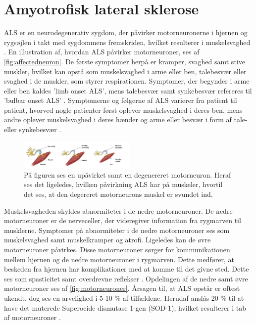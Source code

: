 \section{Amyotrofisk lateral sklerose}
ALS er en neurodegenerativ sygdom, der påvirker motorneuronerne i hjernen og rygsøjlen i takt med sygdommens fremskriden, hvilket resulterer i muskelsvaghed \citep{henschke2012}. En illustration af, hvordan ALS påvirker motorneuroner, ses af \autoref{fig:affectedneuron}. De første symptomer herpå er kramper, svaghed samt stive muskler, hvilket kan opstå som muskelsvaghed i arme eller ben, talebesvær eller svaghed i de muskler, som styrer respirationen. Symptomer, der begynder i arme eller ben kaldes 'limb onset ALS', mens talebesvær samt synkebesvær refereres til 'bulbar onset ALS' \citep{nationalinstitute2016}. 
Symptomerne og følgerne af ALS varierer fra patient til patient, hvorved nogle patienter først oplever muskelsvaghed i deres ben, mens andre oplever muskelsvaghed i deres hænder og arme eller besvær i form af tale- eller synkebesvær \citep{miller2005, nationalinstitute2016}.

\begin{figure}[H]
\centering
\includegraphics[width=0.5\textwidth]{figures/affectedneuron}
\caption{På figuren ses en upåvirket samt en degenereret motorneuron. Heraf ses det ligeledes, hvilken påvirkning ALS har på muskeler, hvortil det ses, at den degereret motorneurons muskel er svundet ind. \citep{drake2015}}
\label{fig:affectedneuron}
\end{figure}
 
Muskelsvagheden skyldes abnormiteter i de nedre motorneuroner. De nedre motorneuroner er de nerveceller, der videregiver information fra rygmarven til musklerne. Symptomer på abnormiteter i de nedre motorneuroner ses som muskelsvaghed samt muskelkramper og atrofi.
Ligeledes kan de øvre motorneuroner påvirkes. Disse motorneuroner sørger for kommunikationen mellem hjernen og de nedre motorneuroner i rygmarven. Dette medfører, at beskeden fra hjernen har komplikationer med at komme til det givne sted. Dette ses som spasticitet samt overdrevne reflekser \citep{nationalinstitute2016}. Opdelingen af de nedre samt øvre motorneuroner ses af \autoref{fig:motorneuroner}.
Årsagen til, at ALS opstår er oftest ukendt, dog ses en arvelighed i 5-10 \% af tilfældene. Herudaf anslås 20 \% til at have det muterede Superocide dismutase 1-gen (SOD-1), hvilket resulterer i tab af motorneuroner \citep{miller2005}.

